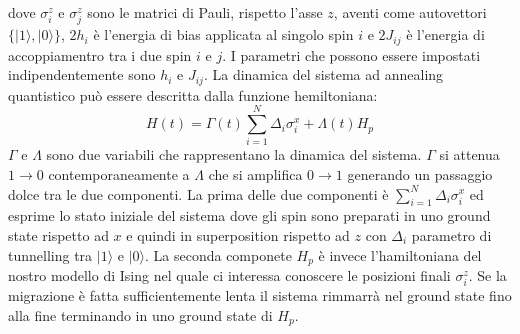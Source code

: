 dove $\sigma_i^z$ e $\sigma_j^z$ sono le matrici di Pauli, rispetto l'asse $z$, aventi come autovettori $\{|1\rangle, |0\rangle\}$, $2h_i$ è l'energia di bias applicata al singolo spin $i$ e $2J_{ij}$ è l'energia di accoppiamentro tra i due spin $i$ e $j$. I parametri che possono essere impostati indipendentemente sono $h_i$ e $J_{ij}$. La dinamica del sistema ad annealing quantistico può essere descritta dalla funzione hemiltoniana:
$$H(t) = \Gamma(t) \sum_{i=1}^N \Delta_i \sigma_i^x + \Lambda(t) H_p$$
$\Gamma$ e $\Lambda$ sono due variabili che rappresentano la dinamica del sistema. $\Gamma$ si attenua $1 \to 0$ contemporaneamente a $\Lambda$ che si amplifica $0 \to 1$ generando un passaggio dolce tra le due componenti. La prima delle due componenti è $\sum_{i=1}^N \Delta_i \sigma_i^x$ ed esprime lo stato iniziale del sistema dove gli spin sono preparati in uno ground state rispetto ad $x$ e quindi in superposition rispetto ad $z$ con $\Delta_i$ parametro di tunnelling tra $|1\rangle$ e $|0\rangle$. La seconda componete $H_p$ è invece l'hamiltoniana del nostro modello di Ising nel quale ci interessa conoscere le posizioni finali $\sigma_i^z$.
Se la migrazione è fatta sufficientemente lenta il sistema rimmarrà nel ground state fino alla fine terminando in uno ground state di $H_p$.

